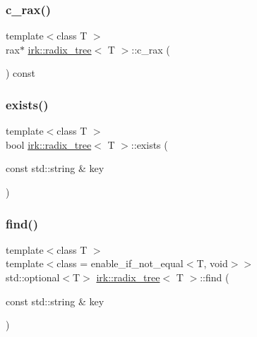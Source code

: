\subsubsection{\texorpdfstring{c\+\_\+rax()}{c\_rax()}}
{\footnotesize\ttfamily template$<$class T $>$ \\
rax$\ast$ \mbox{\hyperlink{classirk_1_1radix__tree}{irk\+::radix\+\_\+tree}}$<$ T $>$\+::c\+\_\+rax (\begin{DoxyParamCaption}{ }\end{DoxyParamCaption}) const\hspace{0.3cm}{\ttfamily [inline]}}

\mbox{\label{classirk_1_1radix__tree_a3b9cecf1586c0e96b3ea55224db7c389}} 
\subsubsection{\texorpdfstring{exists()}{exists()}}
{\footnotesize\ttfamily template$<$class T $>$ \\
bool \mbox{\hyperlink{classirk_1_1radix__tree}{irk\+::radix\+\_\+tree}}$<$ T $>$\+::exists (\begin{DoxyParamCaption}\item[{const std\+::string \&}]{key }\end{DoxyParamCaption})\hspace{0.3cm}{\ttfamily [inline]}}

\mbox{\label{classirk_1_1radix__tree_a7a8f4484dd52244e712e204288e00b15}} 
\subsubsection{\texorpdfstring{find()}{find()}}
{\footnotesize\ttfamily template$<$class T $>$ \\
template$<$class  = enable\+\_\+if\+\_\+not\+\_\+equal$<$\+T, void$>$$>$ \\
std\+::optional$<$T$>$ \mbox{\hyperlink{classirk_1_1radix__tree}{irk\+::radix\+\_\+tree}}$<$ T $>$\+::find (\begin{DoxyParamCaption}\item[{const std\+::string \&}]{key }\end{DoxyParamCaption})\hspace{0.3cm}{\ttfamily [inline]}}

